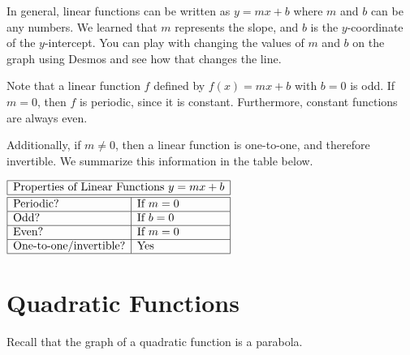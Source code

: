 \documentclass[nooutcomes]{ximera}
\begin{document}
In general, linear functions can be written as $y=mx+b$ where $m$ and $b$ can be any numbers. We learned that $m$ represents the slope, and $b$ is the $y$-coordinate of the $y$-intercept. You can play with changing the values of $m$ and $b$ on the graph using Desmos and see how that changes the line.  

\begin{center}  
\end{center}

Note that a linear function $f$ defined by $f(x) = mx + b$ with $b = 0$ is odd. If $m = 0$, then $f$ is periodic, since it is constant. Furthermore, constant functions are always even.

Additionally, if $m \ne 0$, then a linear function is one-to-one, and therefore invertible. We summarize this information in the table below.

\begin{center}
$
\begin{array}{|l|l|}
 \hline
 \multicolumn{2}{|c|}{\text{\normalfont Properties of Linear Functions } y=mx + b} \\
\hline
 \hline
\text{Periodic?} & \text{If } m = 0 \\ \hline
\text{Odd?} & \text{If } b = 0 \\ \hline
\text{Even?} & \text{If } m = 0 \\ \hline
\text{One-to-one/invertible?} & \text{Yes}\\ \hline
\end{array}
$
\end{center}

\newpage


\section{Quadratic Functions}

Recall that the graph of a quadratic function is a parabola.
\end{document}
